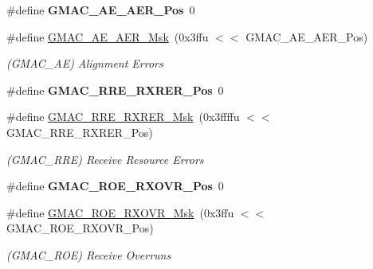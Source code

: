\begin{DoxyCompactItemize}
\mbox{\label{group__SAME70__GMAC_gac5771df40e3d085351c78b21ce0a65ba}} 
\#define {\bfseries G\+M\+A\+C\+\_\+\+A\+E\+\_\+\+A\+E\+R\+\_\+\+Pos}~0
\item 
\mbox{\label{group__SAME70__GMAC_ga9497556190df8f17277d933e55535460}} 
\#define \mbox{\hyperlink{group__SAME70__GMAC_ga9497556190df8f17277d933e55535460}{G\+M\+A\+C\+\_\+\+A\+E\+\_\+\+A\+E\+R\+\_\+\+Msk}}~(0x3ffu $<$$<$ G\+M\+A\+C\+\_\+\+A\+E\+\_\+\+A\+E\+R\+\_\+\+Pos)
\begin{DoxyCompactList}\small\item\em (G\+M\+A\+C\+\_\+\+AE) Alignment Errors \end{DoxyCompactList}\item 
\mbox{\label{group__SAME70__GMAC_ga0339d02bb6bf65aaf92afc4c94cd192c}} 
\#define {\bfseries G\+M\+A\+C\+\_\+\+R\+R\+E\+\_\+\+R\+X\+R\+E\+R\+\_\+\+Pos}~0
\item 
\mbox{\label{group__SAME70__GMAC_gadf41782c23f451aeb9f724dedf196f26}} 
\#define \mbox{\hyperlink{group__SAME70__GMAC_gadf41782c23f451aeb9f724dedf196f26}{G\+M\+A\+C\+\_\+\+R\+R\+E\+\_\+\+R\+X\+R\+E\+R\+\_\+\+Msk}}~(0x3ffffu $<$$<$ G\+M\+A\+C\+\_\+\+R\+R\+E\+\_\+\+R\+X\+R\+E\+R\+\_\+\+Pos)
\begin{DoxyCompactList}\small\item\em (G\+M\+A\+C\+\_\+\+R\+RE) Receive Resource Errors \end{DoxyCompactList}\item 
\mbox{\label{group__SAME70__GMAC_gab3a3fc85fe98876ff5b47fc8a534c359}} 
\#define {\bfseries G\+M\+A\+C\+\_\+\+R\+O\+E\+\_\+\+R\+X\+O\+V\+R\+\_\+\+Pos}~0
\item 
\mbox{\label{group__SAME70__GMAC_ga62aaa204a9495975fa2fb1481fe3e480}} 
\#define \mbox{\hyperlink{group__SAME70__GMAC_ga62aaa204a9495975fa2fb1481fe3e480}{G\+M\+A\+C\+\_\+\+R\+O\+E\+\_\+\+R\+X\+O\+V\+R\+\_\+\+Msk}}~(0x3ffu $<$$<$ G\+M\+A\+C\+\_\+\+R\+O\+E\+\_\+\+R\+X\+O\+V\+R\+\_\+\+Pos)
\begin{DoxyCompactList}\small\item\em (G\+M\+A\+C\+\_\+\+R\+OE) Receive Overruns \end{DoxyCompactList}\item 
$$
\end{DoxyCompactItemize}
